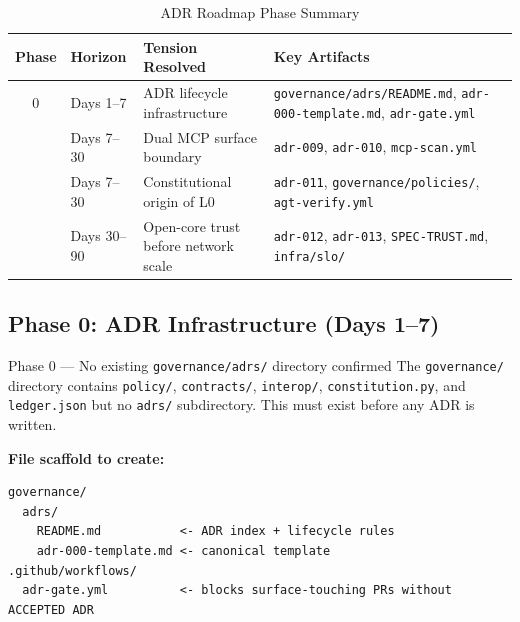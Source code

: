 \documentclass[12pt,a4paper]{article}
\theoremstyle{definition}
\theoremstyle{remark}
\begin{document}
\begin{table}[H]
\centering
\caption{ADR Roadmap Phase Summary}
\begin{tabular}{clp{4cm}p{5cm}}
\toprule
\textbf{Phase} & \textbf{Horizon} & \textbf{Tension Resolved} & \textbf{Key Artifacts} \\
\midrule
0 & Days 1--7   & ADR lifecycle infrastructure & \texttt{governance/adrs/README.md},
                                                 \texttt{adr-000-template.md},
                                                 \texttt{adr-gate.yml} \\
\addlinespace
1 & Days 7--30  & Dual MCP surface boundary & \texttt{adr-009}, \texttt{adr-010},
                                               \texttt{mcp-scan.yml} \\
\addlinespace
2 & Days 7--30  & Constitutional origin of L0 & \texttt{adr-011},
                                                \texttt{governance/policies/},
                                                \texttt{agt-verify.yml} \\
\addlinespace
3 & Days 30--90 & Open-core trust before network scale & \texttt{adr-012}, \texttt{adr-013},
                                                         \texttt{SPEC-TRUST.md},
                                                         \texttt{infra/slo/} \\
\bottomrule
\end{tabular}
\end{table}

\subsection{Phase 0: ADR Infrastructure (Days 1--7)}

\begin{adrbox}{Phase 0 — No existing \texttt{governance/adrs/} directory confirmed}
The \texttt{governance/} directory contains \texttt{policy/}, \texttt{contracts/},
\texttt{interop/}, \texttt{constitution.py}, and \texttt{ledger.json} but no
\texttt{adrs/} subdirectory. This must exist before any ADR is written.
\end{adrbox}

\textbf{File scaffold to create:}
\begin{verbatim}
governance/
  adrs/
    README.md           <- ADR index + lifecycle rules
    adr-000-template.md <- canonical template
.github/workflows/
  adr-gate.yml          <- blocks surface-touching PRs without ACCEPTED ADR
\end{verbatim}
\end{document}
